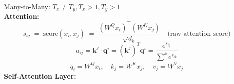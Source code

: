 \documentclass[8pt,twocolumn]{article}
\begin{document}
Many-to-Many: $T_x \neq T_y, T_x > 1, T_y > 1$\\
  \noindent{}
\textbf{Attention:}
\[
s_{ij} \;=\; \mathrm{score}(x_i, x_j)
\;=\;\frac{(W^Q x_i)^\top (W^K x_j)}{\sqrt{d_k}}
\quad\text{(raw attention score)}
\]
\[a_{ij} = \mathbf{k}^j\cdot \mathbf{q}^i = (\mathbf{k}^j)^T \mathbf{q}^i = \frac{e^{s_{ij}}}{\sum_{}^{k} e^{s_{ik}}}\] 
\[
      q_i = W^Q x_i,\quad
      k_j = W^K x_j,\quad
      v_j = W^V x_j
    \]
\textbf{Self-Attention Layer:}\\
\noindent{}
\end{document}
